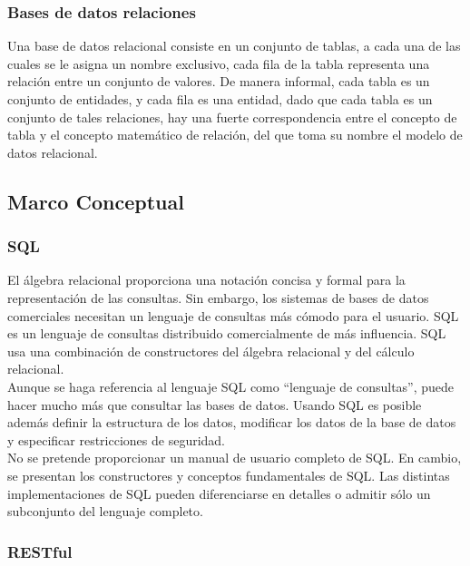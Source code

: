 	
		\subsubsection{Bases de datos relaciones}
		
		{Una base de datos relacional consiste en un conjunto de tablas, a cada una de las cuales se le asigna un nombre exclusivo, cada fila de la tabla representa una relación entre un conjunto de valores. De manera informal, cada tabla es un conjunto de entidades, y cada fila es una entidad, dado que cada tabla es un conjunto de tales relaciones, hay una fuerte correspondencia entre el concepto de tabla y el concepto matemático de relación, del que toma su nombre el modelo de datos relacional.}
		
	
	\subsection{Marco Conceptual}
	
		\subsubsection{SQL}
		
		{El álgebra relacional proporciona una notación concisa y formal para la representación de las consultas. Sin embargo, los sistemas de bases de datos comerciales necesitan un lenguaje de consultas más cómodo para el usuario. SQL es un lenguaje de consultas distribuido comercialmente de más influencia. SQL usa una combinación de constructores del álgebra relacional y del cálculo relacional.\\
			
		Aunque se haga referencia al lenguaje SQL como “lenguaje de consultas”, puede hacer mucho más que consultar las bases de datos. Usando SQL es posible además definir la estructura de los datos, modificar los datos de la base de datos y especificar restricciones de seguridad.\\
	
		No se pretende proporcionar un manual de usuario completo de SQL. En cambio, se presentan los constructores y conceptos fundamentales de SQL. Las distintas implementaciones de SQL pueden diferenciarse en detalles o admitir sólo un subconjunto del lenguaje completo.}
	
	
		\subsubsection{RESTful}
		
